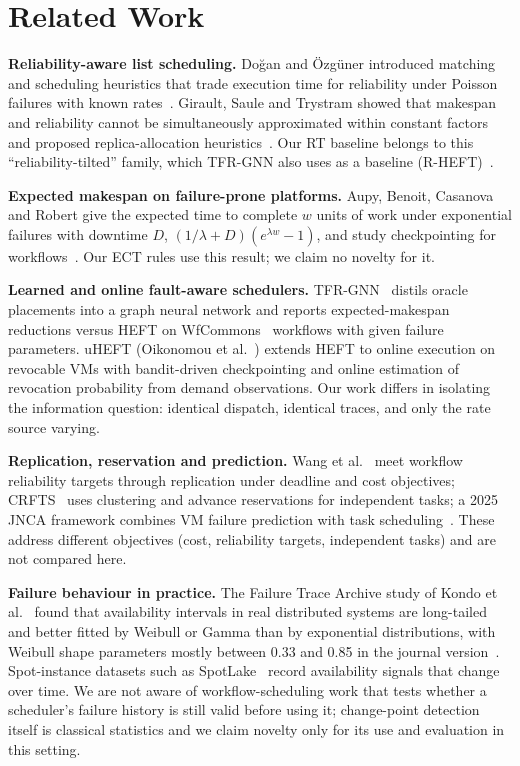 \documentclass[10pt,twocolumn,letterpaper]{article}
\newcommand{\ECT}{\textsf{ECT}}
\newcommand{\RT}{\textsf{RT}}
\begin{document}
\section{Related Work}
\textbf{Reliability-aware list scheduling.} Doğan and Özgüner introduced matching and
scheduling heuristics that trade execution time for reliability under Poisson failures with
known rates~\cite{dogan2001trading,dogan2005biobjective}. Girault, Saule and Trystram showed
that makespan and reliability cannot be simultaneously approximated within constant factors
and proposed replica-allocation heuristics~\cite{girault2008reliability}. Our \RT{} baseline belongs to
this ``reliability-tilted'' family, which TFR-GNN also uses as a baseline
(R-HEFT)~\cite{yang2026tfrgnn}.

\textbf{Expected makespan on failure-prone platforms.} Aupy, Benoit, Casanova and Robert give
the expected time to complete $w$ units of work under exponential failures with downtime $D$,
$(1/\lambda + D)(e^{\lambda w}-1)$, and study checkpointing for workflows~\cite{aupy2016checkpointing}.
Our \ECT{} rules use this result; we claim no novelty for it.

\textbf{Learned and online fault-aware schedulers.} TFR-GNN~\cite{yang2026tfrgnn} distils oracle
placements into a graph neural network and reports expected-makespan reductions versus HEFT on
WfCommons~\cite{coleman2022wfcommons} workflows with given failure parameters. uHEFT
(Oikonomou et al.~\cite{oikonomou2025proactive}) extends HEFT to online execution on revocable VMs
with bandit-driven checkpointing and online estimation of revocation probability from demand
observations. Our work differs in isolating the information question: identical dispatch,
identical traces, and only the rate source varying.

\textbf{Replication, reservation and prediction.} Wang et al.~\cite{wang2026reliable} meet workflow
reliability targets through replication under deadline and cost objectives; CRFTS~\cite{mushtaq2025crfts}
uses clustering and advance reservations for independent tasks; a 2025 JNCA framework combines VM
failure prediction with task scheduling~\cite{jnca2025robust}. These address different objectives
(cost, reliability targets, independent tasks) and are not compared here.

\textbf{Failure behaviour in practice.} The Failure Trace Archive study of Kondo et al.~\cite{kondo2010fta}
found that availability intervals in real distributed systems are long-tailed and better fitted by
Weibull or Gamma than by exponential distributions, with Weibull shape parameters mostly between
0.33 and 0.85 in the journal version~\cite{javadi2013fta}. Spot-instance datasets such as SpotLake~\cite{lee2022spotlake}
record availability signals that change over time. We are not aware of workflow-scheduling work that tests whether a
scheduler's failure history is still valid before using it; change-point detection itself is classical
statistics and we claim novelty only for its use and evaluation in this setting.
\end{document}
